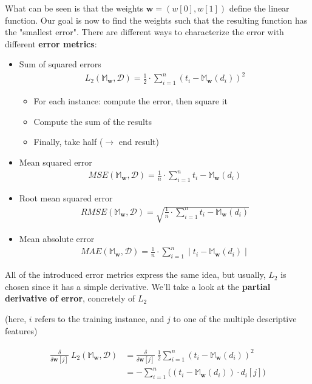What can be seen is that the weights $\mathbf{w}=(w[0], w[1])$ define the linear function. Our goal is now to find the weights such that the resulting function has the "smallest error". There are different ways to characterize the error with different \textbf{error metrics}:
\begin{itemize}
  \item Sum of squared errors 
  \begin{align*}
    L_2(\mathbb{M}_\mathbf{w}, \mathcal{D}) = \frac{1}{2} \cdot \sum_{i=1}^n (t_i - \mathbb{M}_\mathbf{w}(d_i))^2
  \end{align*}
  \begin{note}
    \begin{itemize}
      \item For each instance: compute the error, then square it
      \item Compute the sum of the results
      \item Finally, take half ($\rightarrow$ end result)
    \end{itemize}
  \end{note}
  \item Mean squared error 
  \begin{align*}
    MSE(\mathbb{M}_\mathbf{w}, \mathcal{D}) = \frac{1}{n} \cdot \sum_{i=1}^n t_i - \mathbb{M}_\mathbf{w}(d_i)
  \end{align*}
  \item Root mean squared error 
  \begin{align*}
    RMSE(\mathbb{M}_\mathbf{w}, \mathcal{D}) = \sqrt{\frac{1}{n} \cdot \sum_{i=1}^n t_i - \mathbb{M}_\mathbf{w}(d_i)}
  \end{align*}
  \item Mean absolute error 
  \begin{align*}
    MAE(\mathbb{M}_\mathbf{w}, \mathcal{D}) = \frac{1}{n} \cdot \sum_{i=1}^n \mid t_i - \mathbb{M}_\mathbf{w}(d_i) \mid
  \end{align*}
\end{itemize}

All of the introduced error metrics express the same idea, but usually, $L_2$ is chosen since it has a simple derivative. We'll take a look at the \textbf{partial derivative of error}, concretely of $L_2$ \begin{note}(here, $i$ refers to the training instance, and $j$ to one of the multiple descriptive features)\end{note}
\begin{align*}\begin{aligned}
  \frac{\delta}{\delta \mathbf{w}[j]}\ L_2(\mathbb{M}_\mathbf{w}, \mathcal{D}) 
    &= \frac{\delta}{\delta \mathbf{w}[j]}\ \frac{1}{2}\sum_{i=1}^n (t_i-\mathbb{M}_\mathbf{w}(d_i))^2\\
    &= - \sum_{i=1}^n \big((t_i - \mathbb{M}_\mathbf{w}(d_i)) \cdot d_i[j]\big)
\end{aligned}\end{align*}

